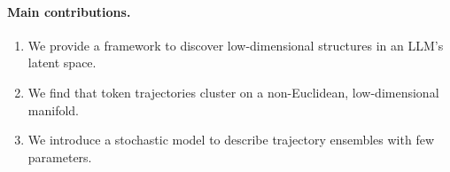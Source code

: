\documentclass{article} %
\begin{document}
\paragraph{Main contributions.}
\begin{enumerate}
    \item We provide a framework to discover low-dimensional structures in an LLM's latent space.
    \item We find that token trajectories cluster on a non-Euclidean, low-dimensional manifold.
    \item We introduce a stochastic model to describe trajectory ensembles with few parameters.
\end{enumerate}








\end{document}
